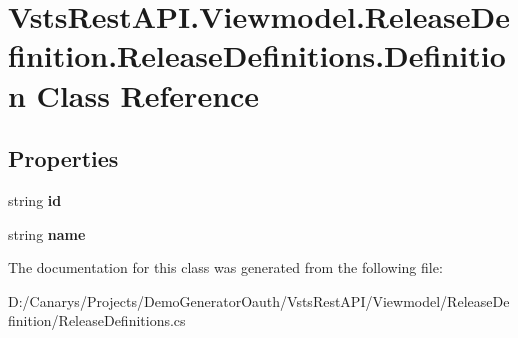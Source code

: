 \hypertarget{class_vsts_rest_a_p_i_1_1_viewmodel_1_1_release_definition_1_1_release_definitions_1_1_definition}{}\section{Vsts\+Rest\+A\+P\+I.\+Viewmodel.\+Release\+Definition.\+Release\+Definitions.\+Definition Class Reference}
\label{class_vsts_rest_a_p_i_1_1_viewmodel_1_1_release_definition_1_1_release_definitions_1_1_definition}
\subsection*{Properties}
\begin{DoxyCompactItemize}
\item 
\mbox{\label{class_vsts_rest_a_p_i_1_1_viewmodel_1_1_release_definition_1_1_release_definitions_1_1_definition_ad24a7de4cdd8e34d7255287dd7c6817f}} 
string {\bfseries id}
\item 
\mbox{\label{class_vsts_rest_a_p_i_1_1_viewmodel_1_1_release_definition_1_1_release_definitions_1_1_definition_afd5e834b5f9d117ffe2bd4063eecfa66}} 
string {\bfseries name}
\end{DoxyCompactItemize}


The documentation for this class was generated from the following file\+:\begin{DoxyCompactItemize}
\item 
D\+:/\+Canarys/\+Projects/\+Demo\+Generator\+Oauth/\+Vsts\+Rest\+A\+P\+I/\+Viewmodel/\+Release\+Definition/Release\+Definitions.\+cs\end{DoxyCompactItemize}
